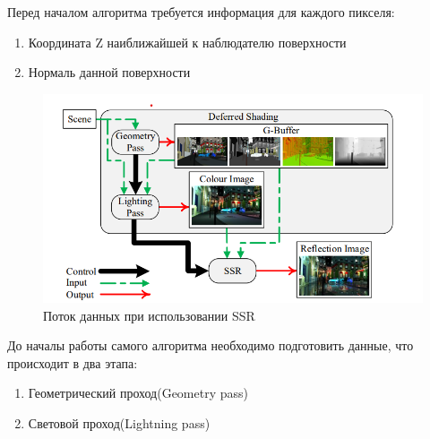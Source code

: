 \documentclass[a4paper,14pt, unknownkeysallowed]{extreport}
\begin{document}
Перед началом алгоритма требуется информация для каждого пикселя:
\begin{enumerate}
	\item Координата Z наиближайшей к наблюдателю поверхности
	\item Нормаль данной поверхности
\end{enumerate}

\begin{figure}[H]
	\centering
	\includegraphics{SSR_data_flow.png}
	\caption{Поток данных при использовании SSR}
	\label{fig:SSR_data_flow}
\end{figure} 

До началы работы самого алгоритма необходимо подготовить данные, что происходит в два этапа:
\begin{enumerate}
	\item Геометрический проход(Geometry pass)
	\item Световой проход(Lightning pass)
\end{enumerate}
\end{document}

